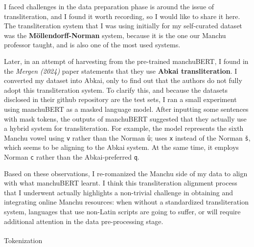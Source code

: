 \documentclass[
  letterpaper,
  DIV=11,
  numbers=noendperiod]{scrartcl}
\makeatletter
\let\oldparagraph\paragraph
\renewcommand{\paragraph}{
    \@ifstar
      \xxxParagraphStar
      \xxxParagraphNoStar
  }
\newcommand{\xxxParagraphStar}[1]{\oldparagraph*{#1}\mbox{}}
\newcommand{\xxxParagraphNoStar}[1]{\oldparagraph{#1}\mbox{}}
\makeatother
\begin{document}
\begin{tcolorbox}[enhanced jigsaw, title=\textcolor{quarto-callout-note-color}{\faInfo}\hspace{0.5em}{The issue of Transliteration Alignment}, colbacktitle=quarto-callout-note-color!10!white, breakable, opacitybacktitle=0.6, colback=white, colframe=quarto-callout-note-color-frame, leftrule=.75mm, bottomrule=.15mm, coltitle=black, left=2mm, arc=.35mm, toptitle=1mm, toprule=.15mm, bottomtitle=1mm, rightrule=.15mm, titlerule=0mm, opacityback=0]

I faced challenges in the data preparation phase is around the issue of
transliteration, and I found it worth recording, so I would like to
share it here. The transliteration system that I was using initially for
my self-curated dataset was the \textbf{Möllendorff-Norman} system,
because it is the one our Manchu professor taught, and is also one of
the most used systems.

Later, in an attempt of harvesting from the pre-trained manchuBERT, I
found in the \emph{Mergen (2024)} paper statements that they use
\textbf{Abkai transliteration}. I converted my dataset into Abkai, only
to find out that the authors do not fully adopt this transliteration
system. To clarify this, and because the datasets disclosed in their
github repository are the test sets, I ran a small experiment using
manchuBERT as a masked language model. After inputting some sentences
with mask tokens, the outputs of manchuBERT suggested that they actually
use a hybrid system for transliteration. For example, the model
represents the sixth Manchu vowel using \texttt{v} rather than the
Norman \texttt{ū}; uses \texttt{x} instead of the Norman \texttt{š},
which seems to be aligning to the Abkai system. At the same time, it
employs Norman \texttt{c} rather than the Abkai-preferred \texttt{q}.

Based on these observations, I re-romanized the Manchu side of my data
to align with what manchuBERT learnt. I think this transliteration
alignment process that I underwent actually highlights a non-trivial
challenge in obtaining and integrating online Manchu resources: when
without a standardized transliteration system, languages that use
non-Latin scripts are going to suffer, or will require additional
attention in the data pre-processing stage.

\end{tcolorbox}

\paragraph{Tokenization}\label{tokenization}
\end{document}
